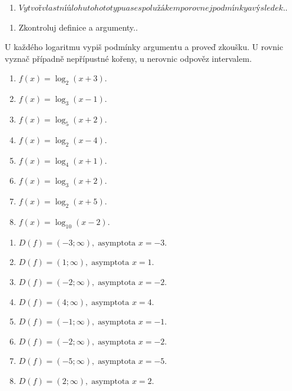 \documentclass[11pt,a4paper]{article}
\begin{document}
\begin{zadaniReseniBox}[title={Rozšíření 1}]
\begin{enumerate}[label=\alph*)]
\item $Vytvoř vlastní úlohu tohoto typu a se spolužákem porovnej podmínky a výsledek.$.
\end{enumerate}
\tcblower
\begin{enumerate}[label=\alph*)]
\item Zkontroluj definice a argumenty..
\end{enumerate}
\end{zadaniReseniBox}
U každého logaritmu vypiš podmínky argumentu a proveď zkoušku. U rovnic vyznač případně nepřípustné kořeny, u nerovnic odpověz intervalem.
\begin{zadaniReseniBox}[title={Domácí úkol}]
\begin{enumerate}[label=\alph*)]
\item $f(x)=\log_{2}(x+3)$.
\item $f(x)=\log_{3}(x-1)$.
\item $f(x)=\log_{5}(x+2)$.
\item $f(x)=\log_{2}(x-4)$.
\item $f(x)=\log_{4}(x+1)$.
\item $f(x)=\log_{3}(x+2)$.
\item $f(x)=\log_{2}(x+5)$.
\item $f(x)=\log_{10}(x-2)$.
\end{enumerate}
\tcblower
\begin{enumerate}[label=\alph*)]
\item $D(f)=(-3;\infty),\;\text{asymptota }x=-3$.
\item $D(f)=(1;\infty),\;\text{asymptota }x=1$.
\item $D(f)=(-2;\infty),\;\text{asymptota }x=-2$.
\item $D(f)=(4;\infty),\;\text{asymptota }x=4$.
\item $D(f)=(-1;\infty),\;\text{asymptota }x=-1$.
\item $D(f)=(-2;\infty),\;\text{asymptota }x=-2$.
\item $D(f)=(-5;\infty),\;\text{asymptota }x=-5$.
\item $D(f)=(2;\infty),\;\text{asymptota }x=2$.
\end{enumerate}
\end{zadaniReseniBox}
\end{document}
